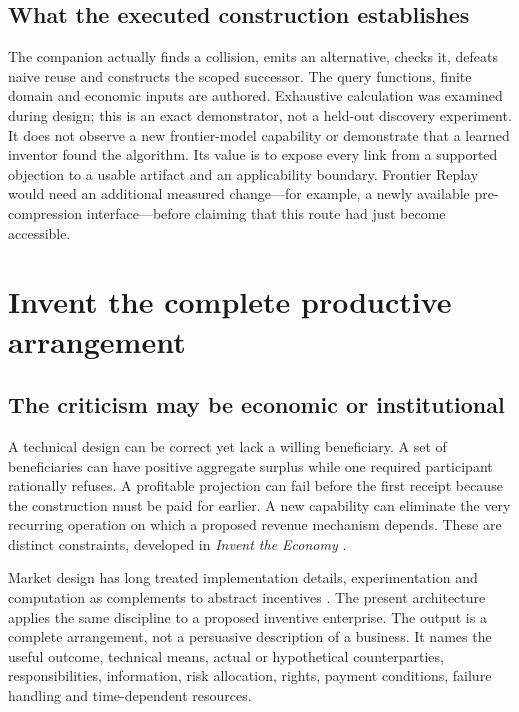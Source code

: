 \subsection{What the executed construction establishes}
The companion actually finds a collision, emits an alternative, checks it, defeats naive reuse and constructs the scoped successor. The query functions, finite domain and economic inputs are authored. Exhaustive calculation was examined during design; this is an exact demonstrator, not a held-out discovery experiment. It does not observe a new frontier-model capability or demonstrate that a learned inventor found the algorithm. Its value is to expose every link from a supported objection to a usable artifact and an applicability boundary. Frontier Replay would need an additional measured change---for example, a newly available pre-compression interface---before claiming that this route had just become accessible.



\section{Invent the complete productive arrangement}
\label{sec:economy}
\subsection{The criticism may be economic or institutional}
A technical design can be correct yet lack a willing beneficiary. A set of beneficiaries can have positive aggregate surplus while one required participant rationally refuses. A profitable projection can fail before the first receipt because the construction must be paid for earlier. A new capability can eliminate the very recurring operation on which a proposed revenue mechanism depends. These are distinct constraints, developed in \emph{Invent the Economy} \citep[\S2--9]{boucher_economy}.

Market design has long treated implementation details, experimentation and computation as complements to abstract incentives \citep{marketdesign}. The present architecture applies the same discipline to a proposed inventive enterprise. The output is a complete arrangement, not a persuasive description of a business. It names the useful outcome, technical means, actual or hypothetical counterparties, responsibilities, information, risk allocation, rights, payment conditions, failure handling and time-dependent resources.

